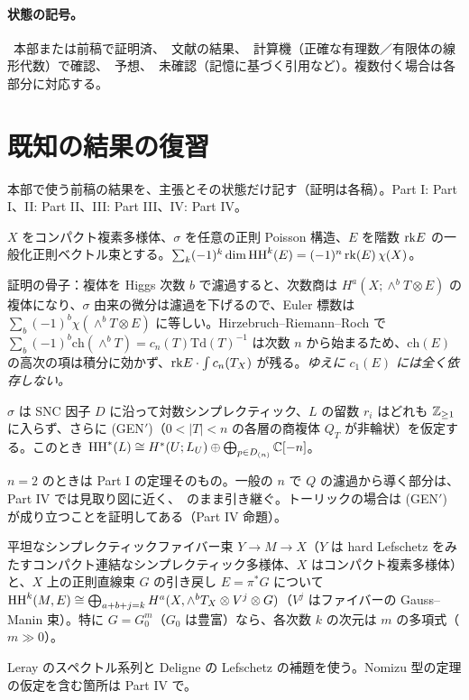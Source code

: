\paragraph{状態の記号。}\tP\ 本部または前稿で証明済、\tC\ 文献の結果、\tV\ 計算機（正確な有理数／有限体の線形代数）で確認、\tK\ 予想、\tQ\ 未確認（記憶に基づく引用など）。複数付く場合は各部分に対応する。

\section{既知の結果の復習}\label{p5:sec:recall}
本部で使う前稿の結果を、主張とその状態だけ記す（証明は各稿）。Part I: Part I、II: Part II、III: Part III、IV: Part IV。

\begin{thm}\label{p5:thm:E}
$X$ をコンパクト複素多様体、$\sigma$ を任意の正則 Poisson 構造、$E$ を階数 $\mathrm{rk} E$ の一般化正則ベクトル束とする。$\sum_k(-1)^k\dim\mathrm{HH}^k(E)=(-1)^n\,\mathrm{rk}(E)\,\chi(X)$。
\end{thm}
証明の骨子：複体を Higgs 次数 $b$ で濾過すると、次数商は $H^a(X;\wedge^bT\otimes E)$ の複体になり、$\sigma$ 由来の微分は濾過を下げるので、Euler 標数は $\sum_b(-1)^b\chi(\wedge^bT\otimes E)$ に等しい。Hirzebruch--Riemann--Roch で $\sum_b(-1)^b\mathrm{ch}(\wedge^bT)=c_n(T)\mathrm{Td}(T)^{-1}$ は次数 $n$ から始まるため、$\mathrm{ch}(E)$ の高次の項は積分に効かず、$\mathrm{rk} E\cdot\int c_n(T_X)$ が残る。\emph{ゆえに $c_1(E)$ には全く依存しない。}

\begin{thm}\label{p5:thm:R}
$\sigma$ は SNC 因子 $D$ に沿って対数シンプレクティック、$L$ の留数 $r_i$ はどれも $\mathbb Z_{\ge1}$ に入らず、さらに (GEN$'$)（$0<|T|<n$ の各層の商複体 $Q_T$ が非輪状）を仮定する。このとき $\mathrm{HH}^*(L)\cong H^*(U;L_U)\oplus\bigoplus_{p\in D_{(n)}}\mathbb C[-n]$。
\end{thm}
$n=2$ のときは Part I の定理そのもの。一般の $n$ で $Q$ の濾過から導く部分は、Part IV では見取り図に近く、\tQ\ のまま引き継ぐ。トーリックの場合は (GEN$'$) が成り立つことを証明してある（Part IV 命題）。

\begin{thm}\label{p5:thm:L}
平坦なシンプレクティックファイバー束 $Y\to M\to X$（$Y$ は hard Lefschetz をみたすコンパクト連結なシンプレクティック多様体、$X$ はコンパクト複素多様体）と、$X$ 上の正則直線束 $G$ の引き戻し $E=\pi^*G$ について $\mathrm{HH}^k(M,E)\cong\bigoplus_{a+b+j=k}H^a(X,\wedge^bT_X\otimes V^j\otimes G)$（$V^j$ はファイバーの Gauss--Manin 束）。特に $G=G_0^m$（$G_0$ は豊富）なら、各次数 $k$ の次元は $m$ の多項式（$m\gg0$）。
\end{thm}
Leray のスペクトル系列と Deligne の Lefschetz の補題を使う。Nomizu 型の定理の仮定を含む箇所は Part IV で\tQ。

